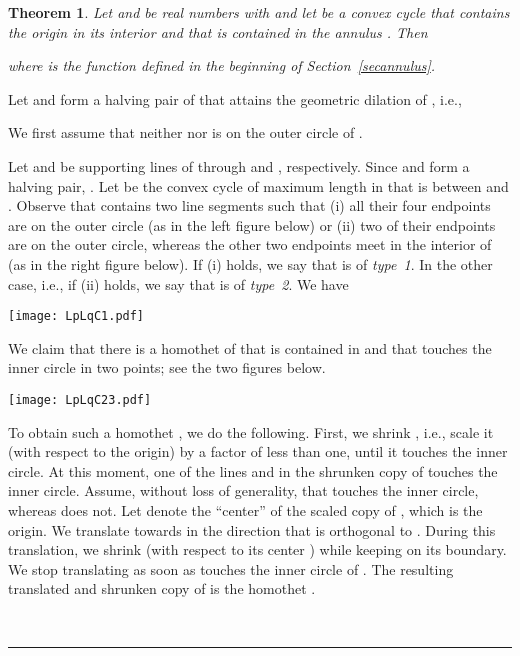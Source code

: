\documentclass[12pt]{article}
\newtheorem{theorem}{Theorem}
\newcommand{\qed}{\rule{0.5em}{1.5ex}}
\newcommand{\fqed}{{\hfill~\qed}}
\newenvironment{proof}{{\noindent \bf Proof.}}
                      {{\hfill \fqed} \vspace{1em}}
\begin{document}
\begin{theorem}    \label{thmcycle}  
Let  and  be real numbers with  and let  be a convex 
cycle that contains the origin in its interior and that is contained in 
the annulus . Then  
 
where  is the function defined in the beginning of 
Section~\ref{secannulus}. 
\end{theorem} 
\begin{proof} 
Let  and  form a halving pair of  that attains the geometric 
dilation of , i.e., 
  
We first assume that neither  nor  is on the outer circle of 
. 
 
Let  and  be supporting lines of  through  and , 
respectively. Since  and  form a halving pair, .  
Let  be the convex cycle of maximum length in  that is 
between  and . Observe that  contains two line segments 
such that (i) all their four endpoints are on the outer circle (as in 
the left figure below) or (ii) two of their endpoints are on the outer 
circle, whereas the other two endpoints meet in the interior of 
 (as in the right figure below). If (i) holds, we say that 
 is of \emph{type~1}. In the other case, i.e., if (ii) holds, we 
say that  is of \emph{type~2}. We have 
  

\begin{center}
   \texttt{[image: LpLqC1.pdf]}
\end{center}

We claim that there is a homothet  of  that is contained in 
 and that touches the inner circle in two points; see the 
two figures below. 

\begin{center}
   \texttt{[image: LpLqC23.pdf]}
\end{center}

To obtain such a homothet , we do the following. First, we shrink 
, i.e., scale it (with respect to the origin) by a factor of less 
than one, until it touches the inner circle. At this moment, one 
of the lines  and  in the shrunken copy of  touches 
the inner circle. Assume, without loss of generality, that  
touches the inner circle, whereas  does not. Let  denote 
the ``center'' of the scaled copy of , which is the origin. 
We translate  towards  in the direction that is orthogonal to 
. During this translation, we shrink  (with respect to its 
center ) while keeping  on its boundary. We stop translating 
 as soon as  touches the inner circle of .
The resulting translated and shrunken copy of  is the homothet 
. 


\end{proof}
\end{document}
